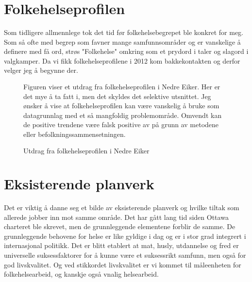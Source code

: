 \documentclass[11pt]{memoir} %
\begin{document}
	\section{Folkehelseprofilen}
		\paragraph{}
			Som tidligere allmennlege tok det tid før folkehelsebegrepet ble konkret for meg. Som så ofte med begrep som favner mange samfunnsområder og er vanskelige å definere med få ord, strøs "Folkehelse" omkring som et prydord i taler og slagord i valgkamper. Da vi fikk folkehelseprofilene i 2012 kom bakkekontakten og derfor velger jeg å begynne der.  

                    \begin{figure}[ht]
                      \centering
                      \captionsetup{singlelinecheck=off}
                      \caption{Utdrag fra folkehelseprofilen i Nedre Eiker}
                      {Figuren viser et utdrag fra folkehelseprofilen i Nedre Eiker. Her er det mye å ta fatt i, men det skyldes det selektive utsnittet. Jeg ønsker å vise at folkehelseprofilen kan være vanskelig å bruke som datagrunnlag med et så mangfoldig problemområde. Omvendt kan de positive trendene være falsk positive av på grunn av metodene eller befolkningssammensetningen.\cite{fhprofil}}\label{fhprofilnekbilde}%
                    \end{figure}    

		
	\section{Eksisterende planverk}
		\paragraph{}
			Det er viktig å danne seg et bilde av eksisterende planverk og hvilke tiltak som allerede jobber inn mot samme område. Det har gått lang tid siden Ottawa charteret\cite{ottawa} ble skrevet, men de grunnleggende elementene forblir de samme. De grunnleggende behovene for helse er like gyldige i dag og er i stor grad integrert i internasjonal politikk. Det er blitt etablert at mat, husly, utdannelse og fred er universelle suksessfaktorer for å kunne være et suksessrikt samfunn, men også for god livskvalitet. Og ved stikkordet livskvalitet er vi kommet til måleenheten for folkehelsearbeid, og kanskje også vnalig helsearbeid.\\
\end{document}
